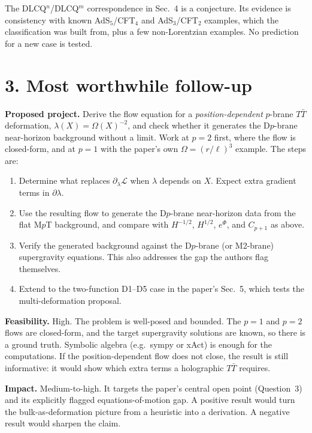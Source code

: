 \documentclass[11pt]{article}
\begin{document}
The DLCQ$^n$/DLCQ$^m$ correspondence in Sec.~4 is a conjecture. Its evidence is consistency with known AdS$_5$/CFT$_4$ and AdS$_3$/CFT$_2$ examples, which the classification was built from, plus a few non-Lorentzian examples. No prediction for a new case is tested.

\section*{3. Most worthwhile follow-up}

\textbf{Proposed project.} Derive the flow equation for a \emph{position-dependent} $p$-brane $T\bar T$ deformation, $\lambda(X)=\Omega(X)^{-2}$, and check whether it generates the D$p$-brane near-horizon background without a limit. Work at $p=2$ first, where the flow is closed-form, and at $p=1$ with the paper's own $\Omega=(r/\ell)^3$ example. The steps are:
\begin{enumerate}
\item Determine what replaces $\partial_\lambda\mathcal L$ when $\lambda$ depends on $X$. Expect extra gradient terms in $\partial\lambda$.
\item Use the resulting flow to generate the D$p$-brane near-horizon data from the flat M$p$T background, and compare with $H^{-1/2}$, $H^{1/2}$, $e^\Phi$, and $C_{p+1}$ as above.
\item Verify the generated background against the D$p$-brane (or M2-brane) supergravity equations. This also addresses the gap the authors flag themselves.
\item Extend to the two-function D1--D5 case in the paper's Sec.~5, which tests the multi-deformation proposal.
\end{enumerate}

\textbf{Feasibility.} High. The problem is well-posed and bounded. The $p=1$ and $p=2$ flows are closed-form, and the target supergravity solutions are known, so there is a ground truth. Symbolic algebra (e.g.\ sympy or xAct) is enough for the computations. If the position-dependent flow does not close, the result is still informative: it would show which extra terms a holographic $T\bar T$ requires.

\textbf{Impact.} Medium-to-high. It targets the paper's central open point (Question~3) and its explicitly flagged equations-of-motion gap. A positive result would turn the bulk-as-deformation picture from a heuristic into a derivation. A negative result would sharpen the claim.
\end{document}
